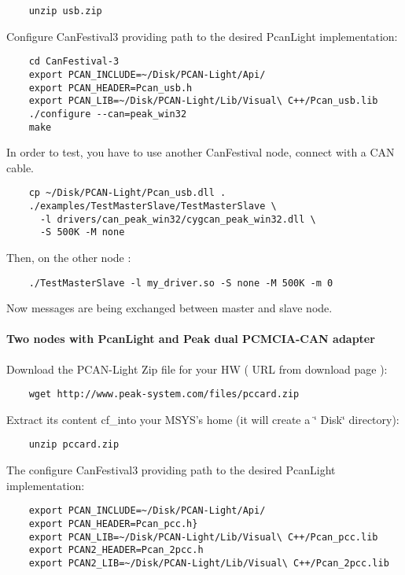 \documentclass[12pt,english,a4paper]{book}
\begin{document}
\begin{verbatim}
	unzip usb.zip
\end{verbatim}


Configure CanFestival3 providing path to the desired PcanLight implementation:

\begin{verbatim}
	cd CanFestival-3
	export PCAN_INCLUDE=~/Disk/PCAN-Light/Api/
	export PCAN_HEADER=Pcan_usb.h
	export PCAN_LIB=~/Disk/PCAN-Light/Lib/Visual\ C++/Pcan_usb.lib
	./configure --can=peak_win32
	make
\end{verbatim}

In order to test, you have to use another CanFestival node, connect
with a CAN cable.


\begin{verbatim}
	cp ~/Disk/PCAN-Light/Pcan_usb.dll .
	./examples/TestMasterSlave/TestMasterSlave \
	  -l drivers/can_peak_win32/cygcan_peak_win32.dll \
	  -S 500K -M none
\end{verbatim}

Then, on the other node :

\begin{verbatim}
	./TestMasterSlave -l my_driver.so -S none -M 500K -m 0
\end{verbatim}
Now messages are being exchanged between master and slave node.


\paragraph{Two nodes with PcanLight and Peak dual PCMCIA-CAN adapter}

Download the PCAN-Light Zip file for your HW ( URL from download page
):

\begin{verbatim}
	wget http://www.peak-system.com/files/pccard.zip
\end{verbatim}
Extract its content cf_into your MSYS's home (it will create a \char`\"{}
Disk\char`\"{} directory):

\begin{verbatim}
	unzip pccard.zip
\end{verbatim}
The configure CanFestival3 providing path to the desired PcanLight
implementation:

\begin{verbatim}
	export PCAN_INCLUDE=~/Disk/PCAN-Light/Api/
	export PCAN_HEADER=Pcan_pcc.h}
	export PCAN_LIB=~/Disk/PCAN-Light/Lib/Visual\ C++/Pcan_pcc.lib
	export PCAN2_HEADER=Pcan_2pcc.h
	export PCAN2_LIB=~/Disk/PCAN-Light/Lib/Visual\ C++/Pcan_2pcc.lib
\end{verbatim}
\end{document}
